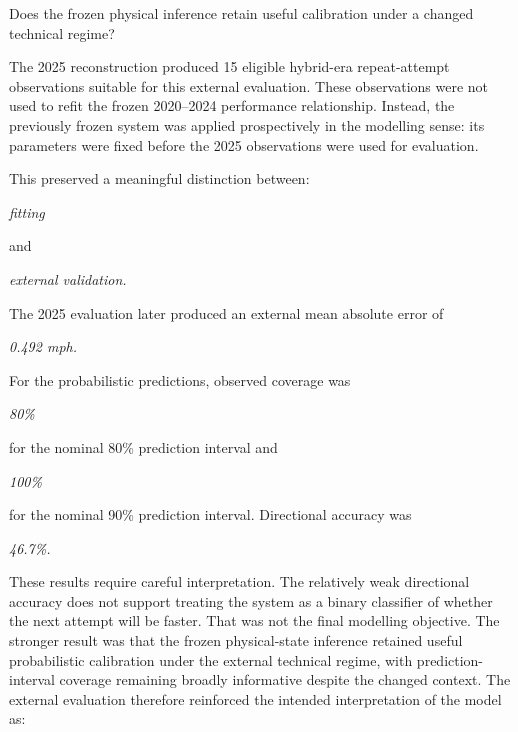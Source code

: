 Does the frozen physical inference retain useful calibration under a changed technical regime?

The 2025 reconstruction produced 15 eligible hybrid-era repeat-attempt observations suitable for this external evaluation. These observations were not used to refit the frozen 2020--2024 performance relationship. Instead, the previously frozen system was applied prospectively in the modelling sense: its parameters were fixed before the 2025 observations were used for evaluation.

This preserved a meaningful distinction between:

\begin{center}\textit{fitting}\end{center}

and

\begin{center}\textit{external validation.}\end{center}

The 2025 evaluation later produced an external mean absolute error of

\begin{center}\textit{0.492 mph.}\end{center}

For the probabilistic predictions, observed coverage was

\begin{center}\textit{80\%}\end{center}

for the nominal 80\% prediction interval and

\begin{center}\textit{100\%}\end{center}

for the nominal 90\% prediction interval. Directional accuracy was

\begin{center}\textit{46.7\%.}\end{center}

These results require careful interpretation. The relatively weak directional accuracy does not support treating the system as a binary classifier of whether the next attempt will be faster. That was not the final modelling objective. The stronger result was that the frozen physical-state inference retained useful probabilistic calibration under the external technical regime, with prediction-interval coverage remaining broadly informative despite the changed context. The external evaluation therefore reinforced the intended interpretation of the model as:

